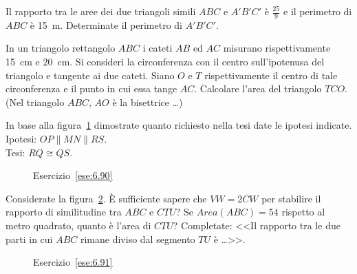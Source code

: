 \begin{multicols}{2}
\begin{esercizio}
\label{ese:6.88}
Il rapporto tra le aree dei due triangoli simili $ABC$ e $A'B'C'$ è 
$\frac{25}{9}$ e il perimetro di $ABC$ è 15~m. Determinate il 
perimetro di $A'B'C'$.
\end{esercizio}

\begin{esercizio}
\label{ese:6.89}
In un triangolo rettangolo $ABC$ i cateti $AB$ ed $AC$ misurano 
rispettivamente 15~cm e 20~cm. Si consideri la circonferenza con il 
centro sull'ipotenusa del triangolo e tangente ai due cateti. Siano 
$O$ e $T$ rispettivamente il centro di tale circonferenza e il punto 
in cui essa tange $AC$. Calcolare l'area del triangolo $TCO$. (Nel 
triangolo $ABC$, $AO$ è la bisettrice \ldots)
\end{esercizio}

\begin{esercizio}
\label{ese:6.90}
In base alla figura~\ref{fig:ese6.90} dimostrate quanto richiesto 
nella tesi date le ipotesi indicate.\\
Ipotesi: $OP\parallel MN\parallel RS$.\\
Tesi: $RQ\cong QS$.
\end{esercizio}


\begin{inaccessibleblock}
 \begin{figure}[!htb]
	\centering
	\caption{Esercizio~\ref{ese:6.90}}\label{fig:ese6.90}
\end{figure}
\end{inaccessibleblock}

\begin{esercizio}
\label{ese:6.91}
Considerate la figura~\ref{fig:ese6.91}. \`E sufficiente sapere che 
$VW=2CW$ per stabilire il rapporto di similitudine tra $ABC$ e $CTU$? 
Se $Area(ABC) = 54$ rispetto al metro quadrato, quanto è l'area di 
$CTU$? Completate: <<Il rapporto tra le due parti in cui $ABC$ rimane 
diviso dal segmento $TU$ è \ldots{}>>.
\end{esercizio}


\begin{inaccessibleblock}
 \begin{figure}[!htb]
	\centering
	\caption{Esercizio~\ref{ese:6.91}}\label{fig:ese6.91}
\end{figure}
\end{inaccessibleblock}


\end{multicols}
